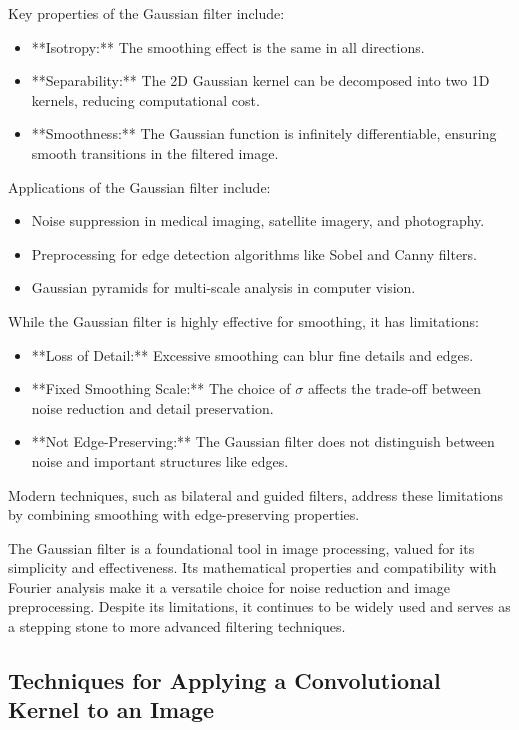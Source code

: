 \documentclass[11pt]{book}
\begin{document}
Key properties of the Gaussian filter include:
\begin{itemize}
    \item **Isotropy:** The smoothing effect is the same in all directions.
    \item **Separability:** The 2D Gaussian kernel can be decomposed into two 1D kernels, reducing computational cost.
    \item **Smoothness:** The Gaussian function is infinitely differentiable, ensuring smooth transitions in the filtered image.
\end{itemize}

Applications of the Gaussian filter include:
\begin{itemize}
    \item Noise suppression in medical imaging, satellite imagery, and photography.
    \item Preprocessing for edge detection algorithms like Sobel and Canny filters.
    \item Gaussian pyramids for multi-scale analysis in computer vision.
\end{itemize}

While the Gaussian filter is highly effective for smoothing, it has limitations:
\begin{itemize}
    \item **Loss of Detail:** Excessive smoothing can blur fine details and edges.
    \item **Fixed Smoothing Scale:** The choice of $\sigma$ affects the trade-off between noise reduction and detail preservation.
    \item **Not Edge-Preserving:** The Gaussian filter does not distinguish between noise and important structures like edges.
\end{itemize}

Modern techniques, such as bilateral and guided filters, address these limitations by combining smoothing with edge-preserving properties.

The Gaussian filter is a foundational tool in image processing, valued for its simplicity and effectiveness. Its mathematical properties and compatibility with Fourier analysis make it a versatile choice for noise reduction and image preprocessing. Despite its limitations, it continues to be widely used and serves as a stepping stone to more advanced filtering techniques.

\subsection{Techniques for Applying a Convolutional Kernel to an Image}
\end{document}
